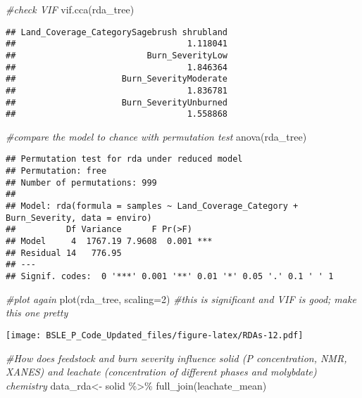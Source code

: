 \documentclass[
]{article}
\newenvironment{Shaded}{\begin{snugshade}}{\end{snugshade}}
\newcommand{\AttributeTok}[1]{\textcolor[rgb]{0.77,0.63,0.00}{#1}}
\newcommand{\CommentTok}[1]{\textcolor[rgb]{0.56,0.35,0.01}{\textit{#1}}}
\newcommand{\DecValTok}[1]{\textcolor[rgb]{0.00,0.00,0.81}{#1}}
\newcommand{\FunctionTok}[1]{\textcolor[rgb]{0.00,0.00,0.00}{#1}}
\newcommand{\NormalTok}[1]{#1}
\newcommand{\OtherTok}[1]{\textcolor[rgb]{0.56,0.35,0.01}{#1}}
\newcommand{\SpecialCharTok}[1]{\textcolor[rgb]{0.00,0.00,0.00}{#1}}
\begin{document}
\begin{Shaded}
\begin{Highlighting}[]
\CommentTok{\#check VIF}
\FunctionTok{vif.cca}\NormalTok{(rda\_tree)}
\end{Highlighting}
\end{Shaded}

\begin{verbatim}
## Land_Coverage_CategorySagebrush shrubland 
##                                  1.118041 
##                          Burn_SeverityLow 
##                                  1.846364 
##                     Burn_SeverityModerate 
##                                  1.836781 
##                     Burn_SeverityUnburned 
##                                  1.558868
\end{verbatim}

\begin{Shaded}
\begin{Highlighting}[]
\CommentTok{\#compare the model to chance with permutation test}
\FunctionTok{anova}\NormalTok{(rda\_tree)}
\end{Highlighting}
\end{Shaded}

\begin{verbatim}
## Permutation test for rda under reduced model
## Permutation: free
## Number of permutations: 999
## 
## Model: rda(formula = samples ~ Land_Coverage_Category + Burn_Severity, data = enviro)
##          Df Variance      F Pr(>F)    
## Model     4  1767.19 7.9608  0.001 ***
## Residual 14   776.95                  
## ---
## Signif. codes:  0 '***' 0.001 '**' 0.01 '*' 0.05 '.' 0.1 ' ' 1
\end{verbatim}

\begin{Shaded}
\begin{Highlighting}[]
\CommentTok{\#plot again}
\FunctionTok{plot}\NormalTok{(rda\_tree, }\AttributeTok{scaling=}\DecValTok{2}\NormalTok{) }\CommentTok{\#this is significant and VIF is good; make this one pretty}
\end{Highlighting}
\end{Shaded}

\texttt{[image: BSLE\_P\_Code\_Updated\_files/figure-latex/RDAs-12.pdf]}

\begin{Shaded}
\begin{Highlighting}[]
\CommentTok{\#How does feedstock and burn severity influence solid (P concentration, NMR, XANES) and leachate (concentration of different phases and molybdate) chemistry }
\NormalTok{data\_rda}\OtherTok{\textless{}{-}}\NormalTok{ solid }\SpecialCharTok{\%\textgreater{}\%}
  \FunctionTok{full\_join}\NormalTok{(leachate\_mean) }
\end{Highlighting}
\end{Shaded}
\end{document}
